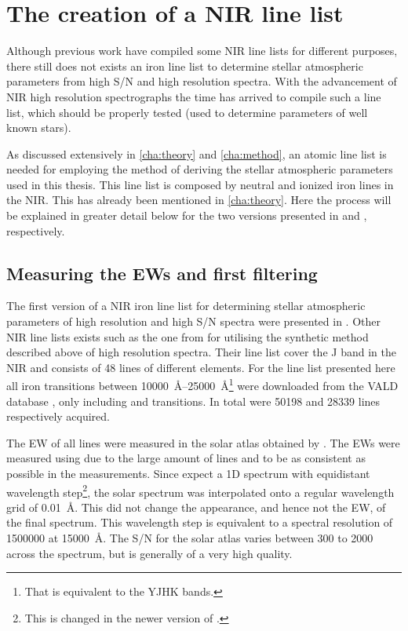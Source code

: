 \section{The creation of a NIR line list}
\label{sec:linelist_first}

Although previous work \citep[see e.g.][]{Onehag2012,Shetrone2015,Lindgren2016} have compiled some
NIR line lists for different purposes, there still does not exists an iron line list to determine
stellar atmospheric parameters from high S/N and high resolution spectra. With the advancement of
NIR high resolution spectrographs the time has arrived to compile such a line list, which should be
properly tested (used to determine parameters of well known stars).

As discussed extensively in \cref{cha:theory} and \cref{cha:method}, an atomic line list is needed
for employing the method of deriving the stellar atmospheric parameters used in this thesis. This
line list is composed by neutral and ionized iron lines in the NIR. This has already been mentioned
in \cref{cha:theory}. Here the process will be explained in greater detail below for the two
versions presented in \citet{Andreasen2016} and \citet{Andreasen2017b}, respectively.


\subsection{Measuring the EWs and first filtering}

The first version of a NIR iron line list for determining stellar atmospheric parameters of high
resolution and high S/N spectra were presented in \citet{Andreasen2016}. Other NIR line lists exists
such as the one from \citet{Onehag2012,Lindgren2016} for utilising the synthetic method described
above of high resolution spectra. Their line list cover the J band in the NIR and consists of 48
lines of different elements. For the line list presented here all iron transitions between
\SIrange{10000}{25000}{\angstrom}\footnote{That is equivalent to the YJHK bands.} were downloaded
from the VALD database \citep{VALD1,VALD2}, only including  and  transitions.
In total were \num{50198}  and \num{28339}  lines respectively acquired.

The EW of all lines were measured in the solar atlas obtained by \citep{Hinkle1995}. The EWs were
measured using  due to the large amount of lines and to be as consistent as possible in
the measurements. Since  expect a 1D spectrum with equidistant wavelength
step\footnote{This is changed in the newer version of  \citep{Sousa2015a}.}, the solar
spectrum was interpolated onto a regular wavelength grid of \SI{0.01}{\angstrom}. This did not
change the appearance, and hence not the EW, of the final spectrum. This wavelength step is
equivalent to a spectral resolution of \num{1500000} at \SI{15000}{\angstrom}. The S/N for the solar
atlas varies between 300 to 2000 across the spectrum, but is generally of a very high quality.

